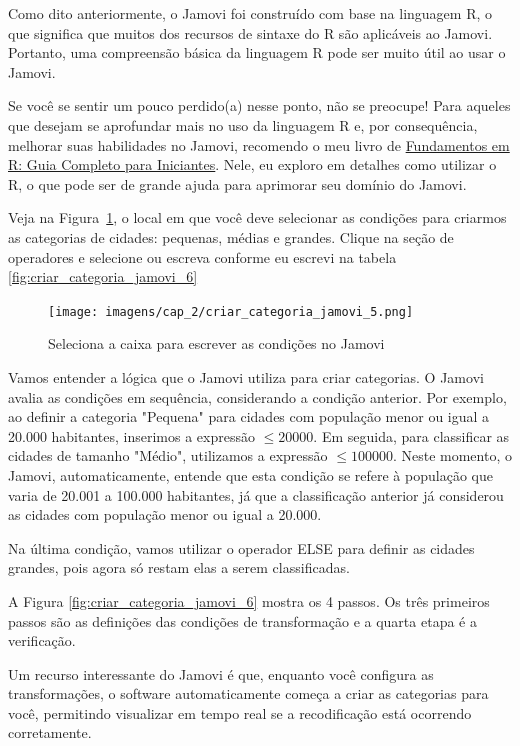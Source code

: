 Como dito anteriormente, o Jamovi foi construído com base na linguagem R, o que significa que muitos dos recursos de sintaxe do R são aplicáveis ao Jamovi. Portanto, uma compreensão básica da linguagem R pode ser muito útil ao usar o Jamovi.

Se você se sentir um pouco perdido(a) nesse ponto, não se preocupe! Para aqueles que desejam se aprofundar mais no uso da linguagem R e, por consequência, melhorar suas habilidades no Jamovi, recomendo o meu livro de \href{https://www.amazon.com.br/Fundamentos-Completo-Iniciantes-programa%C3%A7%C3%A3o-computa%C3%A7%C3%A3o-ebook/dp/B0B36NG18N}{Fundamentos em R: Guia Completo para Iniciantes}. Nele, eu exploro em detalhes como utilizar o R, o que pode ser de grande ajuda para aprimorar seu domínio do Jamovi.

Veja na Figura~\ref{fig:criar_categoria_jamovi_5}, o local em que você deve selecionar as condições para criarmos as categorias de cidades: pequenas, médias e grandes. Clique na seção de operadores e selecione ou escreva conforme eu escrevi na tabela \ref{fig:criar_categoria_jamovi_6}

\begin{figure}[H]
    \centering
    \caption{Seleciona a caixa para escrever as condições no Jamovi}
    \texttt{[image: imagens/cap\_2/criar\_categoria\_jamovi\_5.png]}
    \label{fig:criar_categoria_jamovi_5}
\end{figure}

Vamos entender a lógica que o Jamovi utiliza para criar categorias. O Jamovi avalia as condições em sequência, considerando a condição anterior.  Por exemplo, ao definir a categoria "Pequena" para cidades com população menor ou igual a 20.000 habitantes, inserimos a expressão $\leqslant 20000$. Em seguida, para classificar as cidades de tamanho "Médio", utilizamos a expressão $\leqslant 100000$. Neste momento, o Jamovi, automaticamente, entende que esta condição se refere à população que varia de 20.001 a 100.000 habitantes, já que a classificação anterior já considerou as cidades com população menor ou igual a 20.000.

Na última condição, vamos utilizar o operador ELSE para definir as cidades grandes, pois agora só restam elas a serem classificadas. 

A Figura \ref{fig:criar_categoria_jamovi_6} mostra os 4 passos. Os três primeiros passos são as definições das condições de transformação e a quarta etapa é a verificação.

Um recurso interessante do Jamovi é que, enquanto você configura as transformações, o software automaticamente começa a criar as categorias para você, permitindo visualizar em tempo real se a recodificação está ocorrendo corretamente. 


